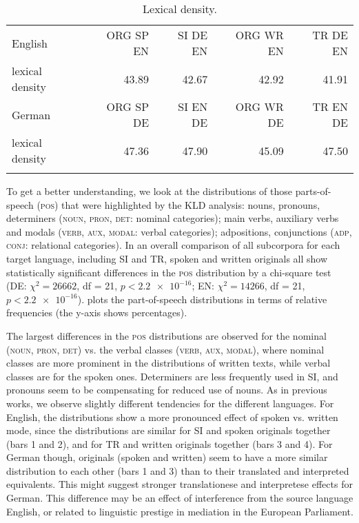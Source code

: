 \documentclass[output=paper,colorlinks,citecolor=brown]{langscibook}
\begin{document}
\begin{table}
\begin{tabular}{lrrrr}
\lsptoprule
English & ORG SP EN & SI DE EN & ORG WR EN & TR DE EN \\
lexical density & 43.89  & 42.67 & 42.92 & 41.91 \\\midrule
German & ORG SP DE & SI EN DE & ORG WR DE & TR EN DE \\
lexical density & 47.36 & 47.90 & 45.09 & 47.50\\
\lspbottomrule
\end{tabular}
\caption{\label{tab:lex density}Lexical density.}
\end{table}

To get a better understanding, we look at the distributions of those parts-of-speech (\textsc{pos}) that were highlighted by the KLD analysis: nouns, pronouns, determiners (\textsc{noun, pron, det}: nominal categories); main verbs, auxiliary verbs and modals (\textsc{verb, aux, modal}: verbal categories); adpositions, conjunctions (\textsc{adp, conj}: relational categories). In an overall comparison of all subcorpora for each target language, including SI and TR, spoken and written originals all show statistically significant differences in the \textsc{pos} distribution by a chi-square test (DE: $\chi^2 = 26662$, df = 21, $p < \num{2.2e-16}$; EN: $\chi^2 = 14266$, df = 21, $p < \num{2.2e-16}$).  plots the part-of-speech distributions in terms of relative frequencies (the y-axis shows percentages). 

The largest differences in the \textsc{pos} distributions are observed for the nominal (\textsc{noun, pron, det}) vs. the verbal classes (\textsc{verb, aux, modal}), where nominal classes are more prominent in the distributions of written texts, while verbal classes are for the spoken ones. Determiners are less frequently used in SI, and pronouns seem to be compensating for reduced use of nouns.  As in previous works, we observe slightly different tendencies for the different languages. For English, the distributions show a more pronounced effect of spoken vs. written mode, since the distributions are similar for SI and spoken originals together (bars 1 and 2), and for TR and written originals together (bars 3 and 4). For German though, originals (spoken and written) seem to have a more similar distribution to each other (bars 1 and 3) than to their translated and interpreted equivalents. This might suggest stronger translationese and interpretese effects for German. This difference may be an effect of interference from the source language English, or  related to linguistic prestige in mediation in the European Parliament.
\end{document}
